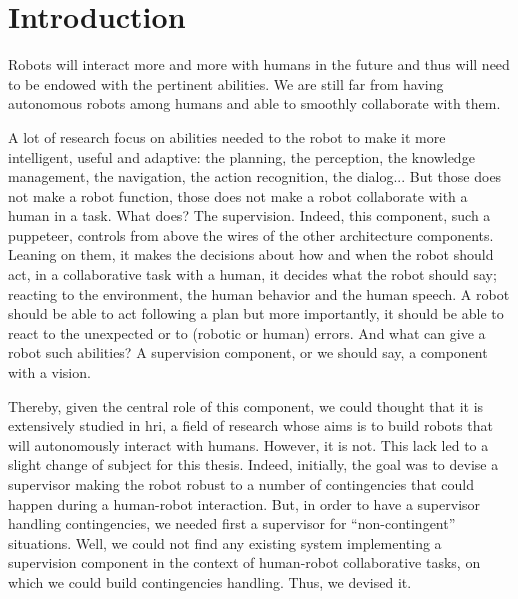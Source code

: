 \documentclass[a4paper,11pt,twoside]{StyleThese}
\begin{document}
\fi


\chapter*{Introduction}

Robots will interact more and more with humans in the future and thus will need to be endowed with the pertinent abilities. We are still far from having autonomous robots among humans and able to smoothly collaborate with them.

A lot of research focus on abilities needed to the robot to make it more intelligent, useful and adaptive: the planning, the perception, the knowledge management, the navigation, the action recognition, the dialog... But those does not make a robot function, those does not make a robot collaborate with a human in a task. What does? The supervision. Indeed, this component, such a puppeteer, controls from above the wires of the other architecture components. Leaning on them, it makes the decisions about how and when the robot should act, in a collaborative task with a human, it decides what the robot should say; reacting to the environment, the human behavior and the human speech. A robot should be able to act following a plan but more importantly, it should be able to react to the unexpected or to (robotic or human) errors. And what can give a robot such abilities? A supervision component, or we should say, a component with a vision.

Thereby, given the central role of this component, we could thought that it is extensively studied in \acrlong{hri}, a field of research whose aims is to build robots that will autonomously interact with humans. However, it is not. This lack led to a slight change of subject for this thesis. Indeed, initially, the goal was to devise a supervisor making the robot robust to a number of contingencies that could happen during a human-robot interaction. But, in order to have a supervisor handling contingencies, we needed first a supervisor for ``non-contingent'' situations. Well, we could not find any existing system implementing a supervision component in the context of human-robot collaborative tasks, on which we could build contingencies handling. Thus, we devised it.
\end{document}
